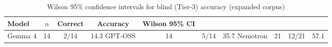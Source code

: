 \begin{table}[htbp]
\centering
\caption{Wilson 95\% confidence intervals for blind (Tier-3) accuracy (expanded corpus)}
\label{tab:wilson_ci_v2}
\begin{tabular}{lcccc}
\toprule
\textbf{Model} & \textbf{$n$} & \textbf{Correct} & \textbf{Accuracy} & \textbf{Wilson 95\% CI} \\
\midrule
Gemma 4 & 14 & 2/14 & 14.3%
GPT-OSS & 14 & 5/14 & 35.7%
Nemotron & 21 & 12/21 & 57.1%
\bottomrule
\end{tabular}
\end{table}
